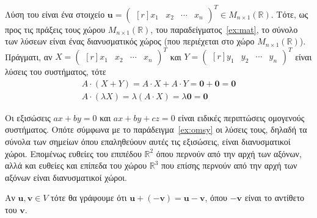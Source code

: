 \begin{examples}
\begin{enumerate}
\begin{equation*}
            \end{equation*} 
            Λύση του είναι ένα στοιχείο $ \mathbf{u} = 
            \begin{pmatrix*}[r]
                x_{1} & x_{2} & \cdots & x_{n} 
            \end{pmatrix*}^{T} \in M_{n \times 1}(\mathbb{R}) $.  Τότε, ως 
            προς τις πράξεις τους χώρου 
            $ M_{n \times 1}(\mathbb{R}) $, του παραδείγματος~\ref{ex:mat}, 
            το σύνολο των λύσεων είναι ένας διανυσματικός χώρος 
            (που περιέχεται στο χώρο $ M_{n \times 1}(\mathbb{R}) $). Πράγματι, 
            αν $ X =\begin{pmatrix*}[r]
                x_{1} & x_{2} & \cdots & x_{n} 
                \end{pmatrix*}^{T} $ και $ Y = \begin{pmatrix*}[r]
                y_{1} & y_{2} & \cdots & y_{n} 
            \end{pmatrix*}^{T} $ είναι λύσεις του συστήματος, τότε
            \begin{gather*}
                A \cdot (X+Y) = A \cdot X + A \cdot Y = \mathbf{0}+ \mathbf{0} = 
                \mathbf{0} \\
                A \cdot (\lambda X) = \lambda (A \cdot X) = \lambda \mathbf{0} = 
                \mathbf{0}
            \end{gather*} 
    \end{enumerate}
\end{examples}

\begin{rem}\label{rem:lines}
    Οι εξισώσεις $ ax + by = 0 $ και $ ax + by + cz = 0 $ είναι ειδικές 
    περιπτώσεις ομογενούς συστήματος. Οπότε σύμφωνα με το παράδειγμα~\ref{ex:omsy} 
    οι λύσεις τους, δηλαδή τα σύνολα των σημείων όπου επαληθεύουν αυτές τις εξισώσεις, 
    είναι διανυσματικοί χώροι. Επομένως ευθείες του επιπέδου $ \mathbb{R}^{2} $ 
    όπου περνούν από την αρχή των αξόνων, αλλά και ευθείες και επίπεδα του χώρου 
    $ \mathbb{R}^{3} $ που επίσης περνούν από την αρχή των αξόνων είναι 
    διανυσματικοί χώροι.
\end{rem}

\begin{rem}
\item {}
    Αν $ \mathbf{u}, \mathbf{v} \in V $ τότε θα γράφουμε ότι 
    $ \mathbf{u} + (- \mathbf{v}) = \mathbf{u} - \mathbf{v} $, 
    όπου $ - \mathbf{v} $ είναι το αντίθετο του $ \mathbf{v} $.
\end{rem}


